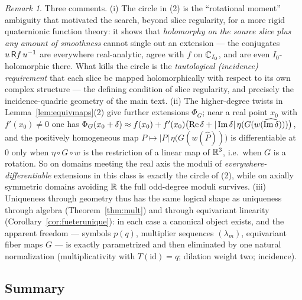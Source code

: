 \documentclass[11pt]{amsart}
\theoremstyle{definition}
\theoremstyle{remark}
\newtheorem{remark}[theorem]{Remark}
\begin{document}
\begin{remark}\label{rem:momentsdiscussion}
Three comments.
(i) The circle in (2) is the ``rotational moment'' ambiguity that
motivated the search, beyond slice regularity, for a more rigid
quaternionic function theory: it shows that \emph{holomorphy on the
source slice plus any amount of smoothness} cannot single out an
extension --- the conjugates $u\,\mathsf{R} f\,u^{-1}$ are everywhere
real-analytic, agree with $f$ on $\mathbb{C}_{I_0}$, and are even
$I_0$-holomorphic there.  What kills the circle is the \emph{tautological
(incidence) requirement} that each slice be mapped holomorphically with
respect to its own complex structure --- the defining condition of slice
regularity, and precisely the incidence-quadric geometry of the main
text.
(ii) The higher-degree twists in Lemma~\ref{lem:equivmaps}(2) give
further extensions $\Phi_G$; near a real point $x_0$ with
$f'(x_0)\neq0$ one has
$\Phi_G(x_0+\delta)\approx f(x_0)+f'(x_0)\bigl(\operatorname{Re}\delta
+|\operatorname{Im}\delta|\,\eta(G(w(\widehat{\operatorname{Im}\delta})))\bigr)$, and the
positively homogeneous map
$P\mapsto|P|\,\eta\bigl(G(w(\widehat P))\bigr)$ is differentiable at
$0$ only when $\eta\circ G\circ w$ is the restriction of a linear map
of $\mathbb{R}^3$, i.e.\ when $G$ is a rotation.  So on domains meeting the
real axis the moduli of \emph{everywhere-differentiable} extensions in
this class is exactly the circle of (2), while on axially symmetric
domains avoiding $\mathbb{R}$ the full odd-degree moduli survives.
(iii) Uniqueness through geometry thus has the same logical shape as
uniqueness through algebra (Theorem~\ref{thm:mult}) and through
equivariant linearity (Corollary~\ref{cor:fueterunique}): in each case a
canonical object exists, and the apparent freedom --- symbols $p(q)$,
multiplier sequences $(\lambda_m)$, equivariant fiber maps $G$ --- is
exactly parametrized and then eliminated by one natural normalization
(multiplicativity with $T(\mathrm{id})=q$; dilation weight two;
incidence).
\end{remark}

\subsection{Summary}\label{app:summary}
\end{document}
